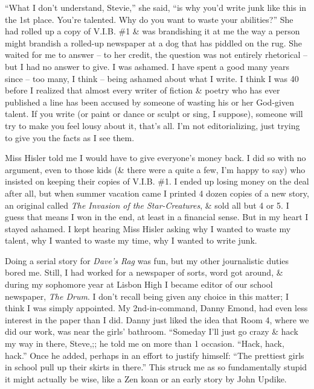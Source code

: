 \documentclass{article}
\numberwithin{equation}{section}
\begin{document}
``What I don't understand, Stevie,'' she said, ``is why you'd write junk like this in the 1st place. You're talented. Why do you want to waste your abilities?'' She had rolled up a copy of V.I.B. \#1 \& was brandishing it at me the way a person might brandish a rolled-up newspaper at a dog that has piddled on the rug. She waited for me to answer -- to her credit, the question was not entirely rhetorical -- but I had no answer to give. I was ashamed. I have spent a good many years since -- too many, I think -- being ashamed about what I write. I think I was 40 before I realized that almost every writer of fiction \& poetry who has ever published a line has been accused by someone of wasting his or her God-given talent. If you write (or paint or dance or sculpt or sing, I suppose), someone will try to make you feel lousy about it, that's all. I'm not editorializing, just trying to give you the facts as I see them.

Miss Hisler told me I would have to give everyone's money back. I did so with no argument, even to those kids (\& there were a quite a few, I'm happy to say) who insisted on keeping their copies of V.I.B. \#1. I ended up losing money on the deal after all, but when summer vacation came I printed 4 dozen copies of a new story, an original called \textit{The Invasion of the Star-Creatures}, \& sold all but 4 or 5. I guess that means I won in the end, at least in a financial sense. But in my heart I stayed ashamed. I kept hearing Miss Hisler asking why I wanted to waste my talent, why I wanted to waste my time, why I wanted to write junk.

 Doing a serial story for \textit{Dave's Rag} was fun, but my other journalistic duties bored me. Still, I had worked for a newspaper of sorts, word got around, \& during my sophomore year at Lisbon High I became editor of our school newspaper, \textit{The Drum}. I don't recall being given any choice in this matter; I think I was simply appointed. My 2nd-in-command, Danny Emond, had even less interest in the paper than I did. Danny just liked the idea that Room 4, where we did our work, was near the girls' bathroom. ``Someday I'll just go crazy \& hack my way in there, Steve,;; he told me on more than 1 occasion. ``Hack, hack, hack.'' Once he added, perhaps in an effort to justify himself: ``The prettiest girls in school pull up their skirts in there.'' This struck me as so fundamentally stupid it might actually be wise, like a Zen koan or an early story by John Updike.
\end{document}
